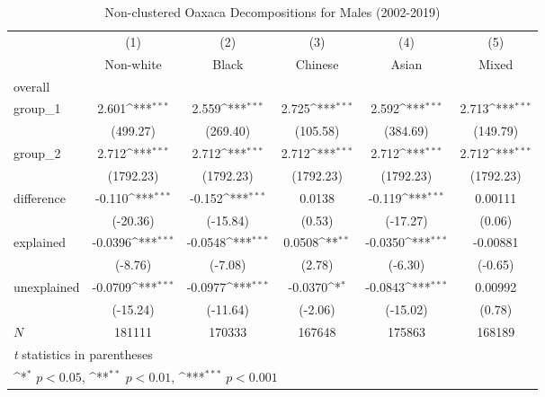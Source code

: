 \begin{table}[htbp]\centering
\def\sym#1{\ifmmode^{#1}\else\(^{#1}\)\fi}
\caption{Non-clustered Oaxaca Decompositions for Males (2002-2019)\label{tab1}}
\begin{tabular}{l*{5}{c}}
\hline\hline
            &\multicolumn{1}{c}{(1)}&\multicolumn{1}{c}{(2)}&\multicolumn{1}{c}{(3)}&\multicolumn{1}{c}{(4)}&\multicolumn{1}{c}{(5)}\\
            &\multicolumn{1}{c}{Non-white}&\multicolumn{1}{c}{Black}&\multicolumn{1}{c}{Chinese}&\multicolumn{1}{c}{Asian}&\multicolumn{1}{c}{Mixed}\\
\hline
overall     &                     &                     &                     &                     &                     \\
group\_1     &       2.601\sym{***}&       2.559\sym{***}&       2.725\sym{***}&       2.592\sym{***}&       2.713\sym{***}\\
            &    (499.27)         &    (269.40)         &    (105.58)         &    (384.69)         &    (149.79)         \\
group\_2     &       2.712\sym{***}&       2.712\sym{***}&       2.712\sym{***}&       2.712\sym{***}&       2.712\sym{***}\\
            &   (1792.23)         &   (1792.23)         &   (1792.23)         &   (1792.23)         &   (1792.23)         \\
difference  &      -0.110\sym{***}&      -0.152\sym{***}&      0.0138         &      -0.119\sym{***}&     0.00111         \\
            &    (-20.36)         &    (-15.84)         &      (0.53)         &    (-17.27)         &      (0.06)         \\
explained   &     -0.0396\sym{***}&     -0.0548\sym{***}&      0.0508\sym{**} &     -0.0350\sym{***}&    -0.00881         \\
            &     (-8.76)         &     (-7.08)         &      (2.78)         &     (-6.30)         &     (-0.65)         \\
unexplained &     -0.0709\sym{***}&     -0.0977\sym{***}&     -0.0370\sym{*}  &     -0.0843\sym{***}&     0.00992         \\
            &    (-15.24)         &    (-11.64)         &     (-2.06)         &    (-15.02)         &      (0.78)         \\
\hline
\(N\)       &      181111         &      170333         &      167648         &      175863         &      168189         \\
\hline\hline
\multicolumn{6}{l}{\footnotesize \textit{t} statistics in parentheses}\\
\multicolumn{6}{l}{\footnotesize \sym{*} \(p<0.05\), \sym{**} \(p<0.01\), \sym{***} \(p<0.001\)}\\
\end{tabular}
\label{tab:oaxaca_male_nonclustered}
\end{table}
